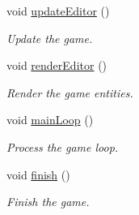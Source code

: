 \begin{DoxyCompactItemize}
void \hyperlink{class_game_a81abd2f677aba0c3f068c902d690e2fb}{update\+Editor} ()
\begin{DoxyCompactList}\small\item\em Update the game. \end{DoxyCompactList}\item 
void \hyperlink{class_game_a204ea65111892ca826f3a65cc8818ea7}{render\+Editor} ()
\begin{DoxyCompactList}\small\item\em Render the game entities. \end{DoxyCompactList}\item 
void \hyperlink{class_game_ae89e277761b7dc5bc7a23fd1b4c6f17d}{main\+Loop} ()
\begin{DoxyCompactList}\small\item\em Process the game loop. \end{DoxyCompactList}\item 
void \hyperlink{class_game_a4a803542276ea0497ad3a87b8983dd67}{finish} ()
\begin{DoxyCompactList}\small\item\em Finish the game. \end{DoxyCompactList}\end{DoxyCompactItemize}
